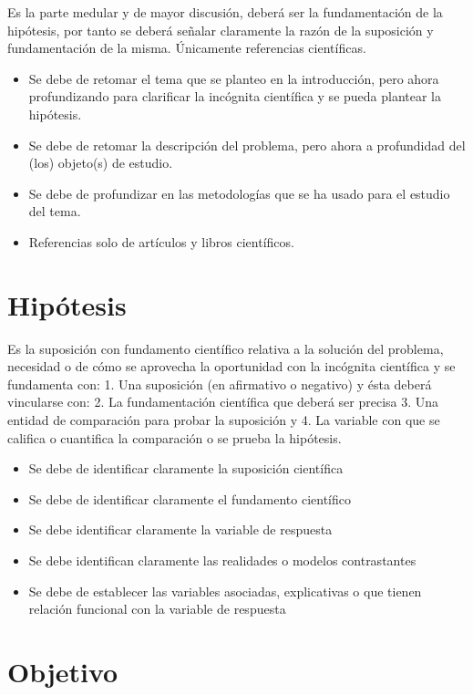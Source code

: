     Es la parte medular y de mayor discusión, deberá ser la fundamentación de la hipótesis, por tanto se deberá señalar claramente la razón de la suposición y fundamentación de la misma. Únicamente referencias científicas.
    \begin{itemize}
        \item Se debe de retomar el tema que se planteo en la introducción, pero ahora profundizando para clarificar la incógnita científica y se pueda plantear la hipótesis.
        \item Se debe de retomar la descripción del problema, pero ahora a profundidad del (los) objeto(s) de estudio. 
        \item Se debe de profundizar en las metodologías que se ha usado para el estudio del tema.
        \item Referencias solo de artículos y libros científicos.
    \end{itemize}
    \section{Hipótesis}
    
    Es la suposición con fundamento científico relativa a la solución del problema, necesidad o de cómo se aprovecha la oportunidad con la incógnita científica y se fundamenta con: 1. Una suposición (en afirmativo o negativo) y ésta deberá vincularse con:
    2. La fundamentación científica que deberá ser precisa 3. Una entidad de comparación para probar la suposición y
    4. La variable con que se califica o cuantifica la comparación o se prueba la hipótesis.
    
    \begin{itemize}
        \item Se debe de identificar claramente la suposición científica
        \item Se debe de identificar claramente el fundamento científico
        \item Se debe identificar claramente la variable de respuesta
        \item Se debe identifican claramente las realidades o modelos contrastantes
        \item Se debe de establecer las variables asociadas, explicativas o que tienen relación funcional con la variable de respuesta
    \end{itemize}
    \section{Objetivo}
    
